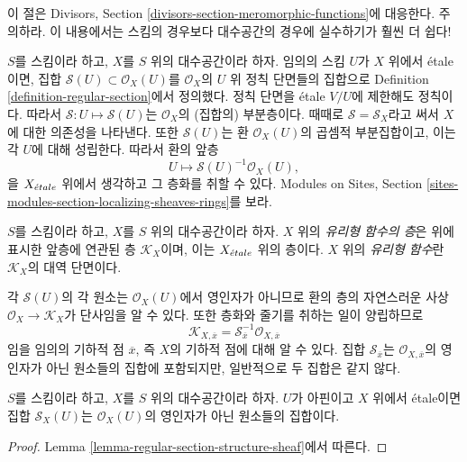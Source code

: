 \noindent
이 절은 Divisors, Section
\ref{divisors-section-meromorphic-functions}에 대응한다.
주의하라. 이 내용에서는 스킴의 경우보다 대수공간의 경우에 실수하기가
훨씬 더 쉽다!

\medskip\noindent
$S$를 스킴이라 하고, $X$를 $S$ 위의 대수공간이라 하자. 임의의 스킴
$U$가 $X$ 위에서 \'etale이면, 집합
$\mathcal{S}(U) \subset \mathcal{O}_X(U)$를 $\mathcal{O}_X$의 $U$ 위 정칙
단면들의 집합으로 Definition
\ref{definition-regular-section}에서 정의했다. 정칙 단면을 \'etale
$V/U$에 제한해도 정칙이다. 따라서
$\mathcal{S} : U \mapsto \mathcal{S}(U)$는 $\mathcal{O}_X$의
(집합의) 부분층이다. 때때로 $\mathcal{S} = \mathcal{S}_X$라고 써서
$X$에 대한 의존성을 나타낸다. 또한 $\mathcal{S}(U)$는 환
$\mathcal{O}_X(U)$의 곱셈적 부분집합이고, 이는 각 $U$에 대해 성립한다.
따라서 환의 앞층
$$
U \longmapsto \mathcal{S}(U)^{-1} \mathcal{O}_X(U),
$$
을 $X_{\acute{e}tale}$ 위에서 생각하고 그 층화를 취할 수 있다. Modules on Sites, Section
\ref{sites-modules-section-localizing-sheaves-rings}를 보라.

\begin{definition}
\label{definition-sheaf-meromorphic-functions}
$S$를 스킴이라 하고, $X$를 $S$ 위의 대수공간이라 하자.
$X$ 위의 {\it 유리형 함수의 층}은 위에 표시한 앞층에 연관된 층
{\it $\mathcal{K}_X$}이며, 이는 $X_{\acute{e}tale}$ 위의 층이다. $X$ 위의
{\it 유리형 함수}란 $\mathcal{K}_X$의 대역 단면이다.
\end{definition}

\noindent
각 $\mathcal{S}(U)$의 각 원소는 $\mathcal{O}_X(U)$에서 영인자가 아니므로
환의 층의 자연스러운 사상 $\mathcal{O}_X \to \mathcal{K}_X$가 단사임을
알 수 있다. 또한 층화와 줄기를 취하는 일이 양립하므로
$$
\mathcal{K}_{X, \overline{x}} =
\mathcal{S}_{\overline{x}}^{-1}\mathcal{O}_{X, \overline{x}}
$$
임을 임의의 기하적 점 $\overline{x}$, 즉 $X$의 기하적 점에 대해 알 수 있다. 집합
$\mathcal{S}_{\overline{x}}$는
$\mathcal{O}_{X, \overline{x}}$의 영인자가 아닌 원소들의 집합에
포함되지만, 일반적으로 두 집합은 같지 않다.

\begin{lemma}
\label{lemma-describe-S}
$S$를 스킴이라 하고, $X$를 $S$ 위의 대수공간이라 하자. $U$가 아핀이고
$X$ 위에서 \'etale이면 집합 $\mathcal{S}_X(U)$는
$\mathcal{O}_X(U)$의 영인자가 아닌 원소들의 집합이다.
\end{lemma}

\begin{proof}
Lemma \ref{lemma-regular-section-structure-sheaf}에서 따른다.
\end{proof}

